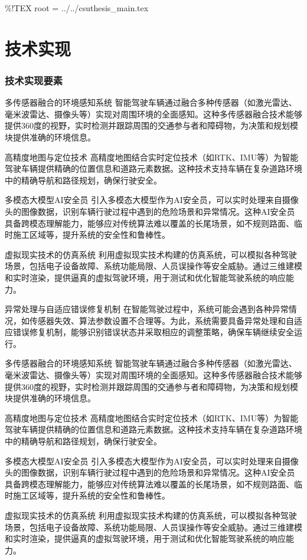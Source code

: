 \%!TEX root = ../../csuthesis\_main.tex

\chapter{技术实现}
\subsection{技术实现要素}
多传感器融合的环境感知系统
智能驾驶车辆通过融合多种传感器（如激光雷达、毫米波雷达、摄像头等）实现对周围环境的全面感知。​这种多传感器融合技术能够提供360度的视野，实时检测并跟踪周围的交通参与者和障碍物，为决策和规划模块提供准确的环境信息。 ​


高精度地图与定位技术
高精度地图结合实时定位技术（如RTK、IMU等）为智能驾驶车辆提供精确的位置信息和道路元素数据。​这种技术支持车辆在复杂道路环境中的精确导航和路径规划，确保行驶安全。 ​


多模态大模型AI安全员
引入多模态大模型作为AI安全员，可以实时处理来自摄像头的图像数据，识别车辆行驶过程中遇到的危险场景和异常情况。​这种AI安全员具备跨模态理解能力，能够应对传统算法难以覆盖的长尾场景，如不规则路面、临时施工区域等，提升系统的安全性和鲁棒性。 ​


虚拟现实技术的仿真系统
利用虚拟现实技术构建的仿真系统，可以模拟各种驾驶场景，包括电子设备故障、系统功能局限、人员误操作等安全威胁。​通过三维建模和实时渲染，提供逼真的虚拟驾驶环境，用于测试和优化智能驾驶系统的响应能力。 ​

异常处理与自适应错误修复机制
在智能驾驶过程中，系统可能会遇到各种异常情况，如传感器失效、算法参数设置不合理等。​为此，系统需要具备异常处理和自适应错误修复机制，能够识别错误状态并采取相应的调整策略，确保车辆继续安全运行。 

多传感器融合的环境感知系统
智能驾驶车辆通过融合多种传感器（如激光雷达、毫米波雷达、摄像头等）实现对周围环境的全面感知。​这种多传感器融合技术能够提供360度的视野，实时检测并跟踪周围的交通参与者和障碍物，为决策和规划模块提供准确的环境信息。 ​

高精度地图与定位技术
高精度地图结合实时定位技术（如RTK、IMU等）为智能驾驶车辆提供精确的位置信息和道路元素数据。​这种技术支持车辆在复杂道路环境中的精确导航和路径规划，确保行驶安全。 ​

多模态大模型AI安全员
引入多模态大模型作为AI安全员，可以实时处理来自摄像头的图像数据，识别车辆行驶过程中遇到的危险场景和异常情况。​这种AI安全员具备跨模态理解能力，能够应对传统算法难以覆盖的长尾场景，如不规则路面、临时施工区域等，提升系统的安全性和鲁棒性。 ​

虚拟现实技术的仿真系统
利用虚拟现实技术构建的仿真系统，可以模拟各种驾驶场景，包括电子设备故障、系统功能局限、人员误操作等安全威胁。​通过三维建模和实时渲染，提供逼真的虚拟驾驶环境，用于测试和优化智能驾驶系统的响应能力。 ​

